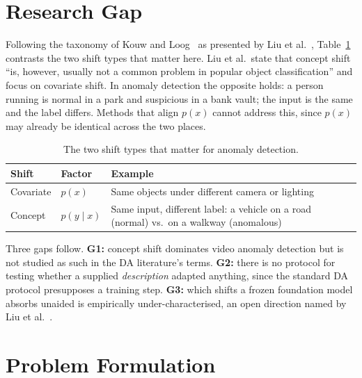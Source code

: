 \documentclass[conference]{IEEEtran}
\begin{document}
\section{Research Gap}

Following the taxonomy of Kouw and Loog~\cite{kouw2018introduction} as presented
by Liu et al.~\cite{liu2022deep}, Table~\ref{tab:shift} contrasts the two shift
types that matter here. Liu et al.\ state that concept shift ``is, however,
usually not a common problem in popular object classification'' and focus on
covariate shift. In anomaly detection the opposite holds: a person running is
normal in a park and suspicious in a bank vault; the input is the same and the
label differs. Methods that align $p(x)$ cannot address this, since $p(x)$ may
already be identical across the two places.

\begin{table}[t]
\caption{The two shift types that matter for anomaly detection.}
\label{tab:shift}
\centering\footnotesize
\begin{tabular}{@{}p{1.55cm}p{1.1cm}p{4.6cm}@{}}
\toprule
\textbf{Shift} & \textbf{Factor} & \textbf{Example} \\
\midrule
Covariate & $p(x)$ & Same objects under different camera or lighting \\
Concept & $p(y\mid x)$ & Same input, different label: a vehicle on a road
(normal) vs.\ on a walkway (anomalous) \\
\bottomrule
\end{tabular}
\end{table}

Three gaps follow. \textbf{G1:} concept shift dominates video anomaly detection
but is not studied as such in the DA literature's terms. \textbf{G2:} there is no
protocol for testing whether a supplied \emph{description} adapted anything,
since the standard DA protocol presupposes a training step. \textbf{G3:} which
shifts a frozen foundation model absorbs unaided is empirically
under-characterised, an open direction named by Liu et al.~\cite{liu2022deep}.

\section{Problem Formulation}
\end{document}
